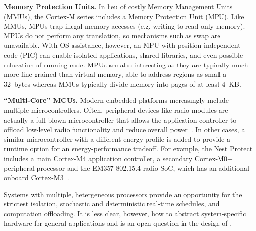 
{\bf Memory Protection Units.}
In lieu of costly Memory Management Units (MMUs), the Cortex-M series includes
a Memory Protection Unit (MPU). Like MMUs, MPUs trap illegal memory accesses
(e.g. writing to read-only memory). MPUs do not perform any translation, so
mechanisms such as swap are unavailable. With OS assistance, however, an MPU
with position independent code (PIC) can enable isolated applications, shared
libraries, and even possible relocation of running code.
MPUs are also interesting as they are typically much more fine-grained than
virtual memory, able to address regions as small a 32~bytes whereas MMUs
typically divide memory into pages of at least 4~KB.

{\bf ``Multi-Core'' MCUs.}
Modern embedded platforms increasingly include multiple microcontrollers.
Often, peripheral devices like radio modules are actually a full blown
microcontroller that allows the application controller to offload low-level radio
functionality and reduce overall power~\cite{nrf51822,cc2540}. In other cases,
a similar microcontroller with a different energy profile is added to provide
a runtime option for an energy-performance tradeoff.  For example, the Nest
Protect includes a main Cortex-M4 application controller, a secondary
Cortex-M0+ peripheral processor and the EM357 802.15.4 radio SoC, which has an
additional onboard Cortex-M3~\cite{nestprotect-teardown}.



Systems with multiple, hetergeneous processors provide an opportunity for
the strictest isolation, stochastic and deterministic real-time schedules, and
computation offloading. It is less clear, however, how to abstract
system-specific hardware for general applications and is an open question in
the design of \name.


